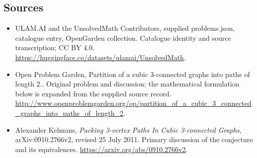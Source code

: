 \documentclass[11pt,a4paper]{article}
\begin{document}
\subsection{Sources}
\begin{itemize}
\item[S1] ULAM.AI and the UnsolvedMath Contributors, supplied problems.json, catalogue entry, OpenGarden collection. Catalogue identity and source transcription; CC BY 4.0.
\url{https://huggingface.co/datasets/ulamai/UnsolvedMath}.
\item[S2] Open Problem Garden, Partition of a cubic 3-connected graphs into paths of length 2.. Original problem and discussion; the mathematical formulation below is expanded from the supplied source record.
\url{http://www.openproblemgarden.org/op/partition_of_a_cubic_3_connected_graphs_into_paths_of_length_2}.
\item[S3] Alexander Kelmans, \emph{Packing 3-vertex Paths In Cubic 3-connected Graphs}, arXiv:0910.2766v2, revised 25 July 2011. Primary discussion of the conjecture and its equivalences.
\url{https://arxiv.org/abs/0910.2766v2}.
\end{itemize}
\end{document}
